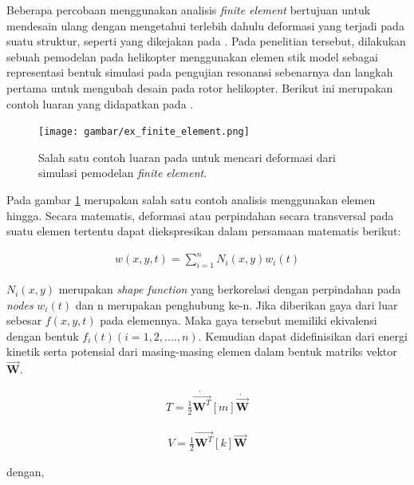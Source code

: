 Beberapa percobaan menggunakan analisis \textit{finite element} bertujuan untuk mendesain ulang dengan mengetahui terlebih dahulu deformasi yang terjadi pada suatu struktur, seperti yang dikejakan pada \cite{Gorecki2013}. Pada penelitian tersebut, dilakukan sebuah pemodelan pada helikopter menggunakan elemen stik model sebagai representasi bentuk simulasi pada pengujian resonansi sebenarnya dan langkah pertama untuk mengubah desain pada rotor helikopter. Berikut ini merupakan contoh luaran yang didapatkan pada \cite{Gorecki2013}.

\begin{figure}[H]
	\centering
	\texttt{[image: gambar/ex\_finite\_element.png]}
	\caption{Salah satu contoh luaran pada \cite{Gorecki2013} untuk mencari deformasi dari simulasi pemodelan \textit{finite element}.}
	\label{fig:ex_finite_element}
\end{figure}

Pada gambar \ref{fig:ex_finite_element} merupakan salah satu contoh analisis menggunakan elemen hingga. Secara matematis, deformasi atau perpindahan secara transversal pada suatu elemen tertentu dapat diekspresikan dalam persamaan matematis berikut:

\begin{align}
	w(x,y,t)=\sum_{i=1}^{n}N_i(x,y)w_i(t)
\end{align}

$N_i(x,y)$ merupakan \textit{shape function} yang berkorelasi dengan perpindahan pada \textit{nodes} $w_i(t)$ dan n merupakan penghubung ke-n. Jika diberikan gaya dari luar sebesar $f(x,y,t)$ pada elemennya. Maka gaya tersebut memiliki ekivalensi dengan bentuk $f_i(t)(i=1, 2, ...., n)$. Kemudian dapat didefinisikan dari energi kinetik serta potensial dari masing-masing elemen dalam bentuk matriks vektor ${\overrightarrow{\textbf{W}}}$. 

\begin{align}
	T=\frac{1}{2}\dot{\overrightarrow{\textbf{W}^T}}[m]\dot{\overrightarrow{\textbf{W}}}
	\label{eq:kinetik_FEM}
\end{align}

\begin{align}
	V=\frac{1}{2}\overrightarrow{\textbf{W}^T}[k]\overrightarrow{\textbf{W}}
	\label{eq:potensial_FEM}
\end{align}

dengan,

